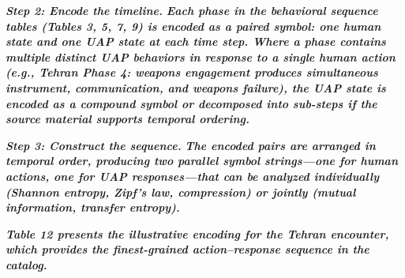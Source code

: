 \documentclass[11pt,letterpaper]{article}
\begin{document}
\textbf{\textit{Step 2: Encode the timeline.}}\textbf{\textit{ Each phase in the behavioral sequence tables (Tables 3, 5, 7, 9) is encoded as a paired symbol: one human state and one UAP state at each time step. Where a phase contains multiple distinct UAP behaviors in response to a single human action (e.g., Tehran Phase 4: weapons engagement produces simultaneous instrument, communication, and weapons failure), the UAP state is encoded as a compound symbol or decomposed into sub-steps if the source material supports temporal ordering.}}


\textbf{\textit{Step 3: Construct the sequence.}}\textbf{\textit{ The encoded pairs are arranged in temporal order, producing two parallel symbol strings---one for human actions, one for UAP responses---that can be analyzed individually (Shannon entropy, Zipf's law, compression) or jointly (mutual information, transfer entropy).}}


\textbf{\textit{Table 12 presents the illustrative encoding for the Tehran encounter, which provides the finest-grained action--response sequence in the catalog.}}


\begin{table}[H]
\centering
\small
{}
\caption*{\small\textit{Table 12. Illustrative encoding of the Tehran behavioral sequence (9 paired steps, 18 total symbols).}}
\end{table}
\end{document}

